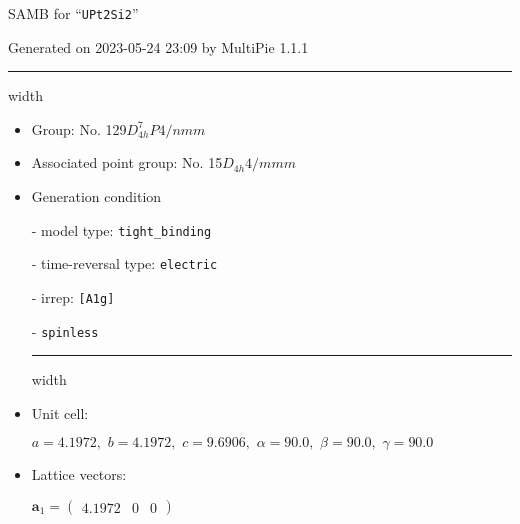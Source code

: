 \documentclass[fleqn,10pt,landscape]{article}
\begin{document}
\setcounter{MaxMatrixCols}{16}

\setlength{\baselineskip}{16pt}
\footnotesize
\begin{center}
\LARGE
SAMB for ``\texttt{UPt2Si2}''
\end{center}
\begin{flushright}
Generated on 2023-05-24 23:09 by MultiPie 1.1.1
\end{flushright}
\vspace{1cm}


 \hfil \hrule height 1mm width \textwidth \hfil

\begin{itemize}
\item Group: No. 129\quad$D_{4h}^{7}$\quad$P4/nmm$\quad[ tetragonal ]

\item Associated point group: No. 15\quad$D_{4h}$\quad$4/mmm$\quad[ tetragonal ]

\vspace{5mm}

\item Generation condition

\quad - model type: \texttt{tight_binding}

\quad - time-reversal type: \texttt{electric}

\quad - irrep: \texttt{[A1g]}

\quad - \texttt{spinless}


 \hfil \hrule height 1mm width \textwidth \hfil

\item Unit cell:

\quad $a=4.1972,\,\, b=4.1972,\,\, c=9.6906,\,\, \alpha=90.0,\,\, \beta=90.0,\,\, \gamma=90.0$

\item Lattice vectors:

\quad $\bm{a}_1=\begin{pmatrix} 4.1972 & 0 & 0 \end{pmatrix}$


\end{itemize}
\end{document}
